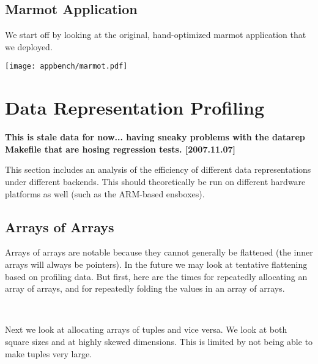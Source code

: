 \documentclass{article}
\begin{document}
\subsection{Marmot Application}

We start off by looking at the original, hand-optimized marmot
application that we deployed.

\begin{center}
\texttt{[image: appbench/marmot.pdf]}
\end{center}

\section{Data Representation Profiling}

{\bf This is stale data for now... having sneaky problems with the
datarep Makefile that are hosing regression tests. [2007.11.07]}

This section includes an analysis of the efficiency of different data
representations under different backends.  This should theoretically
be run on different hardware platforms as well (such as the ARM-based ensboxes).

\subsection{Arrays of Arrays}

Arrays of arrays are notable because they cannot generally be
flattened (the inner arrays will always be pointers).  In the future
we may look at tentative flattening based on profiling data.  But
first, here are the times for repeatedly allocating an array of
arrays, and for repeatedly folding the values in an array of arrays.

\begin{center}
\mbox{
}
\end{center}

Next we look at allocating arrays of tuples and vice versa.  We look at
both square sizes and at highly skewed dimensions.  This is limited by
not being able to make tuples very large.
\begin{center}
\mbox{
}
\end{center}
\end{document}
